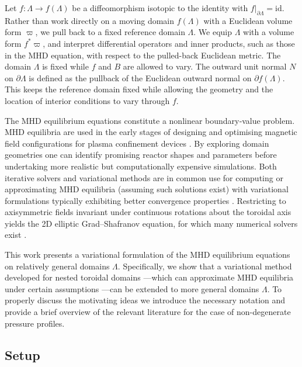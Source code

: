 \documentclass[11pt]{article}
\theoremstyle{plain}
\theoremstyle{definition}
\theoremstyle{remark}
\newcommand{\ST}{\Lambda}
\begin{document}
Let \(f:\ST \to f(\ST)\) be a diffeomorphism isotopic to the identity with \(f|_{\partial \ST} = \mathrm{id}\). Rather than work directly on a moving domain \(f(\ST)\) with a Euclidean volume form \(\varpi\), we pull back to a fixed reference domain \(\ST\). We equip \(\ST\) with a volume form \(f^*\varpi\), and interpret differential operators and inner products, such as those in the MHD equation, with respect to the pulled-back Euclidean metric. The domain \(\ST\) is fixed while \(f\) and \(B\) are allowed to vary. The outward unit normal \(N\) on \(\partial \ST\) is defined as the pullback of the Euclidean outward normal on \(\partial f(\ST)\). This keeps the reference domain fixed while allowing the geometry and the location of interior conditions to vary through \(f\).


The MHD equilibrium equations constitute a nonlinear boundary‐value problem. MHD equilibria are used in the early stages of designing and optimising magnetic field configurations for plasma confinement devices \cite{chen1984introduction, hazeltine2003plasma}. By exploring domain geometries one can identify promising reactor shapes and parameters before undertaking more realistic but computationally expensive simulations. Both iterative solvers and variational methods are in common use for computing or approximating MHD equilibria (assuming such solutions exist) with variational formulations typically exhibiting better convergence properties \cite{loizu2016verification, REIMAN1986157, hirshman2011siesta, helander2013ideal, dudt2020desc, hirshman1986three, chodura19813d, hayashi1995evolution}. Restricting to axisymmetric fields invariant under continuous rotations about the toroidal axis yields the 2D elliptic Grad–Shafranov equation, for which many numerical solvers exist \cite{PATAKI201328, LEE201572, zakharov1999theory, takeda1991computation}.



This work presents a variational formulation of the MHD equilibrium equations on relatively general domains \(\ST\). Specifically, we show that a variational method developed for nested toroidal domains \cite{dennis2014multi}---which can approximate MHD equilibria under certain assumptions \cite{10.1063/1.4795739}---can be extended to more general domains \(\ST\). To properly discuss the motivating ideas we introduce the necessary notation and provide a brief overview of the relevant literature for the case of non-degenerate pressure profiles.


\subsection{Setup}\label{sub:setup}
\end{document}
